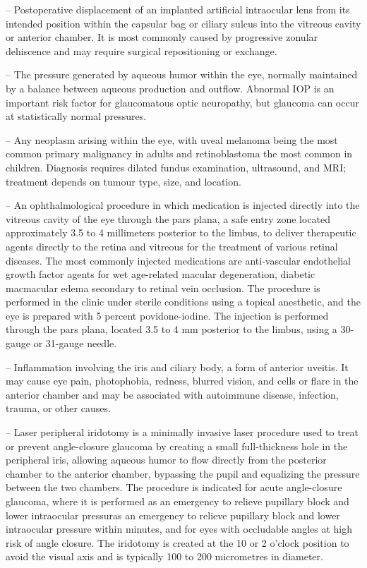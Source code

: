 -- Postoperative displacement of an implanted artificial intraocular lens from its intended position within the capsular bag or ciliary sulcus into the vitreous cavity or anterior chamber. It is most commonly caused by progressive zonular dehiscence and may require surgical repositioning or exchange.

-- The pressure generated by aqueous humor within the eye, normally maintained by a balance between aqueous production and outflow. Abnormal IOP is an important risk factor for glaucomatous optic neuropathy, but glaucoma can occur at statistically normal pressures.

-- Any neoplasm arising within the eye, with uveal melanoma being the most common primary malignancy in adults and retinoblastoma the most common in children. Diagnosis requires dilated fundus examination, ultrasound, and MRI; treatment depends on tumour type, size, and location.

-- An ophthalmological procedure in which medication is injected directly into the vitreous cavity of the eye through the pars plana, a safe entry zone located approximately 3.5 to 4 millimeters posterior to the limbus, to deliver therapeutic agents directly to the retina and vitreous for the treatment of various retinal diseases. The most commonly injected medications are anti-vascular endothelial growth factor agents for wet age-related macular degeneration, diabetic macmacular edema secondary to retinal vein occlusion. The procedure is performed in the clinic under sterile conditions using a topical anesthetic, and the eye is prepared with 5 percent povidone-iodine. The injection is performed through the pars plana, located 3.5 to 4 mm posterior to the limbus, using a 30-gauge or 31-gauge needle.

-- Inflammation involving the iris and ciliary body, a form of anterior uveitis. It may cause eye pain, photophobia, redness, blurred vision, and cells or flare in the anterior chamber and may be associated with autoimmune disease, infection, trauma, or other causes.

-- Laser peripheral iridotomy is a minimally invasive laser procedure used to treat or prevent angle-closure glaucoma by creating a small full-thickness hole in the peripheral iris, allowing aqueous humor to flow directly from the posterior chamber to the anterior chamber, bypassing the pupil and equalizing the pressure between the two chambers. The procedure is indicated for acute angle-closure glaucoma, where it is performed as an emergency to relieve pupillary block and lower intraocular pressuras an emergency to relieve pupillary block and lower intraocular pressure within minutes, and for eyes with occludable angles at high risk of angle closure. The iridotomy is created at the 10 or 2 o'clock position to avoid the visual axis and is typically 100 to 200 micrometres in diameter.


